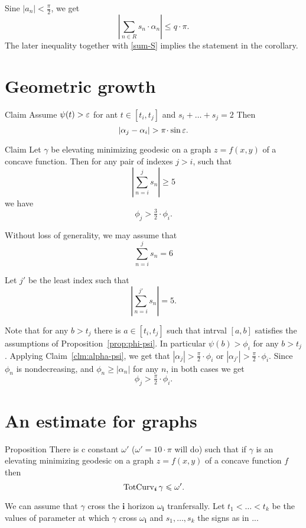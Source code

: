 \documentclass[a4paper,10pt]{amsart}
\begin{document}
Sine $|a_n|<\tfrac\pi2$, we get
\[\left|\sum_{n\in R}s_n\cdot\alpha_n\right|
\le
q\cdot\pi.
\]
The later inequality together with \ref{sum-S} implies the statement in the corollary.
\qeds



\section{Geometric growth}\label{sec:geometric-growth}

\begin{thm}{Claim}\label{clm:alpha-psi}
Assume $\psi(t)>\varepsilon$ for ant $t\in[t_{i},t_{j}]$
and $s_i+\dots+s_j=2$
Then 
\[|\alpha_j-\alpha_i|>\pi\cdot\sin\eps.\] 
\end{thm}


\begin{thm}{Claim}
Let $\gamma$
be elevating minimizing geodesic on a graph $z=f(x,y)$ of a concave function.
Then for any pair of indexes $j>i$,
such that 
\[|\sum_{n=i}^{j}s_n|\ge 5\]
we have
\[\phi_j>\tfrac32\cdot\phi_i.\]
\end{thm}


Without loss of generality, we may assume that 
\[\sum_{n=i}^{j}s_n= 6\]

Let $j'$ be the least index 
such that
\[|\sum_{n=i}^{j'} s_n|=5.\]

Note that for any $b>t_j$ there is $a\in[t_i,t_j]$
such that intrval $[a,b]$ satisfies the assumptions of Proposition~\ref{prop:phi-psi}.
In particular $\psi(b)>\phi_i$ for any $b>t_j$.
Applying Claim~\ref{clm:alpha-psi},
we get that $|\alpha_j|>\tfrac\pi2\cdot \phi_i$ or 
$|\alpha_{j'}|>\tfrac\pi2\cdot \phi_i$.
Since $\phi_n$ is nondecreasing,
and $\phi_n\ge |\alpha_n|$ for any $n$,
in both cases we get
\[\phi_j>\tfrac\pi2\cdot \phi_i.\]
\qeds


\section{An estimate for graphs}\label{sec:graph}

\begin{thm}{Proposition}
There is c constant $\omega'$ ($\omega'=10\cdot\pi$ will do)
such that
if $\gamma$ is an elevating minimizing geodesic on a graph $z=f(x,y)$
of a concave function $f$ then
\[\mathop{\rm TotCurv}\nolimits_{\bm{i}}\gamma\leqslant \omega'.\]
\end{thm}

We can assume that
$\gamma$ cross the $\bm{i}$ horizon $\omega_{\bm{i}}$ tranfersally.
Let $t_1<\dots<t_k$ be the values of parameter at which $\gamma$ cross $\omega_{\bm{i}}$ 
and 
$s_1,\dots,s_k$ the signs as in ...
\end{document}
